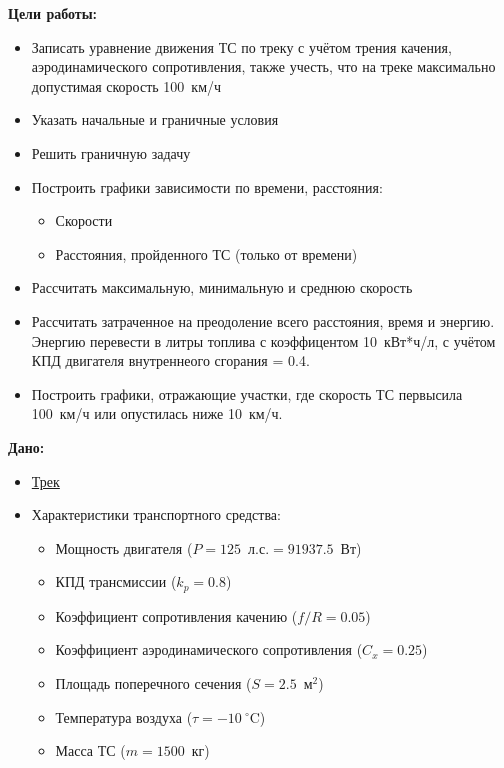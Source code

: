 \documentclass[A4paper,12pt]{article}
\theoremstyle{plain} %
\theoremstyle{definition} %
\theoremstyle{remark} %
\begin{document}
\textbf{Цели работы:}
\begin{itemize}

    \item Записать уравнение движения ТС по треку с учётом трения качения, аэродинамического сопротивления, также учесть, что на треке максимально допустимая скорость 100~км/ч
    \item Указать начальные и граничные условия
    \item Решить граничную задачу
    \item Построить графики зависимости по времени, расстояния:
    \begin{itemize}
        \item Скорости
        \item Расстояния, пройденного ТС (только от времени)
    \end{itemize}
    \item Рассчитать максимальную, минимальную и среднюю скорость
    \item Рассчитать затраченное на преодоление всего расстояния, время и энергию. Энергию перевести в литры топлива с коэффицентом 10~кВт*ч/л, с учётом КПД двигателя внутреннеого сгорания = 0.4.
    \item Построить графики, отражающие участки, где скорость ТС первысила 100~км/ч или опустилась ниже 10~км/ч.
\end{itemize}

\textbf{Дано:}
\begin{itemize}
    \item \href{http://www.gpsies.com/map.do?fileId=cdweryabbnalhhik&referrer=trackList}{Трек}
    \item Характеристики транспортного средства:
    \begin{itemize}
        \item Мощность двигателя ($P=125$~л.с.$= 91937.5$~Вт)
        \item КПД трансмиссии ($k_p=0.8$)
        \item Коэффициент сопротивления качению ($f/R=0.05$)
        \item Коэффициент аэродинамического сопротивления ($C_x=0.25$)
        \item Площадь поперечного сечения ($S=2.5$~м${}^2$)
        \item Температура воздуха ($\tau = -10\ {}^{\circ}$C)
        \item Масса ТС ($m = 1500$~кг)
    \end{itemize}
\end{itemize}
\end{document}
